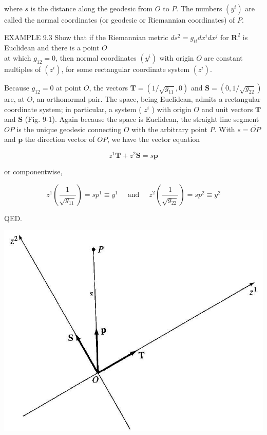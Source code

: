 \documentclass[10pt]{article}
\begin{document}
where $s$ is the distance along the geodesic from $O$ to $P$. The numbers $\left(y^{i}\right)$ are called the normal coordinates (or geodesic or Riemannian coordinates) of $P$.

EXAMPLE 9.3 Show that if the Riemannian metric $d s^{2}=g_{i i} d x^{i} d x^{j}$ for $\mathbf{R}^{2}$ is Euclidean and there is a point $O$\\
at which $g_{12}=0$, then normal coordinates $\left(y^{i}\right)$ with origin $O$ are constant multiples of $\left(z^{i}\right)$, for some rectangular coordinate system $\left(z^{i}\right)$.

Because $g_{12}=0$ at point $O$, the vectors $\mathbf{T}=\left(1 / \sqrt{g_{11}}, 0\right)$ and $\mathbf{S}=\left(0,1 / \sqrt{g_{22}}\right)$ are, at $O$, an orthonormal pair. The space, being Euclidean, admits a rectangular coordinate system; in particular, a system ( $z^{i}$ ) with origin $O$ and unit vectors $\mathbf{T}$ and $\mathbf{S}$ (Fig. 9-1). Again because the space is Euclidean, the straight line segment $O P$ is the unique geodesic connecting $O$ with the arbitrary point $P$. With $s=\overline{O P}$ and $\mathbf{p}$ the direction vector of $O P$, we have the vector equation

$$
z^{1} \mathbf{T}+z^{2} \mathbf{S}=s \mathbf{p}
$$

or componentwise,

$$
z^{1}\left(\frac{1}{\sqrt{g_{11}}}\right)=s p^{1} \equiv y^{1} \quad \text { and } \quad z^{2}\left(\frac{1}{\sqrt{g_{22}}}\right)=s p^{2} \equiv y^{2}
$$

QED.

\begin{center}
\includegraphics[max width=\textwidth]{2024_04_03_41f90be4f896e21f0dc9g-127}
\end{center}
\end{document}
